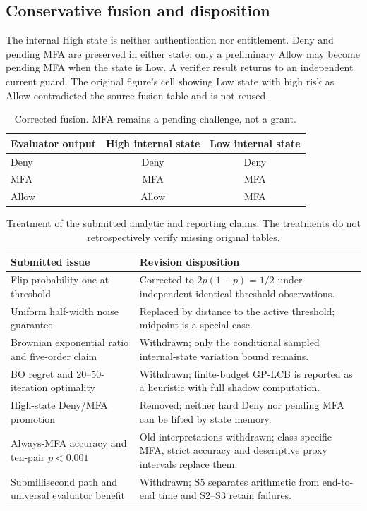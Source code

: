 \documentclass[10pt,onecolumn]{IEEEtran}
\begin{document}
\subsection{Conservative fusion and disposition}
The internal High state is neither authentication nor
entitlement. Deny and pending MFA are preserved in either
state; only a preliminary Allow may become pending MFA
when the state is Low. A verifier result returns to an
independent current guard. The original figure's cell
showing Low state with high risk as Allow contradicted
the source fusion table and is not reused.
\begin{table}[!htbp]
\centering
\caption{Corrected fusion. MFA remains a pending challenge, not a grant.}
\label{tab:supp_fusion}
\footnotesize
\begin{tabular}{lcc}
\toprule
Evaluator output & High internal state & Low internal state\\
\midrule
Deny & Deny & Deny\\
MFA & MFA & MFA\\
Allow & Allow & MFA\\
\bottomrule
\end{tabular}
\end{table}
\begin{table}[!htbp]
\centering
\caption{Treatment of the submitted analytic and reporting claims.
The treatments do not retrospectively verify missing original tables.}
\label{tab:supp_corrections}
\footnotesize
\begin{tabular}{p{}p{}}
\toprule
Submitted issue & Revision disposition\\
\midrule
Flip probability one at threshold & Corrected to \(2p(1-p)=1/2\) under independent identical threshold observations.\\
Uniform half-width noise guarantee & Replaced by distance to the active threshold; midpoint is a special case.\\
Brownian exponential ratio and five-order claim & Withdrawn; only the conditional sampled internal-state variation bound remains.\\
BO regret and 20--50-iteration optimality & Withdrawn; finite-budget GP-LCB is reported as a heuristic with full shadow computation.\\
High-state Deny/MFA promotion & Removed; neither hard Deny nor pending MFA can be lifted by state memory.\\
Always-MFA accuracy and ten-pair \(p<0.001\) & Old interpretations withdrawn; class-specific MFA, strict accuracy and descriptive proxy intervals replace them.\\
Submillisecond path and universal evaluator benefit & Withdrawn; S5 separates arithmetic from end-to-end time and S2--S3 retain failures.\\
\bottomrule
\end{tabular}
\end{table}
\end{document}

